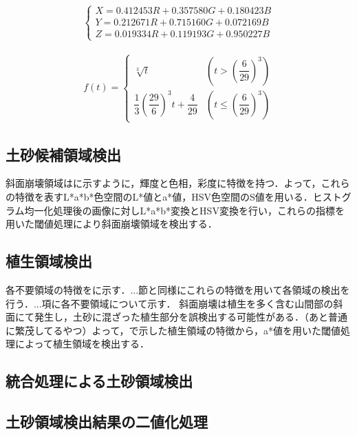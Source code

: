       \begin{eqnarray}
        \label{Lab表色系2}
        \left\{
          \begin{array}{l}
            X = 0.412453R + 0.357580G + 0.180423B \\
            Y = 0.212671R + 0.715160G + 0.072169B \\
            Z = 0.019334R + 0.119193G + 0.950227B
          \end{array}
        \right.
      \end{eqnarray}

      \begin{eqnarray}
        \label{Lab表色系4}
          f(t) = 
          \left\{
            \begin{array}{lll}
              \sqrt[3]{t} 
                &(t >    (\dfrac{6} {29})^3) \\
              \dfrac{1} {3} (\dfrac{29} {6})^3 t + \dfrac{4} {29}
                &(t \leq (\dfrac{6} {29})^3)
            \end{array}
          \right.
      \end{eqnarray}

    \subsection{土砂候補領域検出}
      斜面崩壊領域は\tref{}に示すように，輝度と色相，彩度に特徴を持つ．よって，これらの特徴を表すL*a*b*色空間のL*値とa*値，HSV色空間のS値を用いる．ヒストグラム均一化処理後の画像に対しL*a*b*変換とHSV変換を行い，これらの指標を用いた閾値処理により斜面崩壊領域を検出する．

    \subsection{植生領域検出}
      \label{植生除去}
      各不要領域の特徴を\Fref{}に示す．...節と同様にこれらの特徴を用いて各領域の検出を行う．...項に各不要領域について示す．
      斜面崩壊は植生を多く含む山間部の斜面にて発生し，土砂に混ざった植生部分を誤検出する可能性がある．（あと普通に繁茂してるやつ）よって，\Fref{}で示した植生領域の特徴から，a*値を用いた閾値処理によって植生領域を検出する．

    \subsection{統合処理による土砂領域検出}
    \subsection{土砂領域検出結果の二値化処理}
